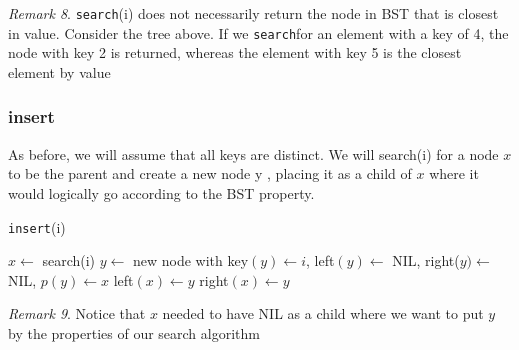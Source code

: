 \documentclass [12pt]{article}
\begin{document}
\textit{Remark 8}. \texttt{search}(i) does not necessarily return the node in BST that is closest in value. Consider the tree above. If we \texttt{search}for an element with a key of 4, the node with key 2 is returned, whereas the element with key 5 is the closest element by value

\subsubsection{insert}
As before, we will assume that all keys are distinct. We will search(i) for a node $x$ to be the parent and create a new node y , placing it as a child of $x$ where it would logically go according to the BST property.

\begin{algorithm}
\caption{\texttt{insert}(i)}\label{alg:bst_inert}
\begin{algorithmic}
\STATE $x \gets $ search(i)
\STATE $y \gets$ new node with key$(y) \gets i$, left$(y) \gets$ NIL, right($y) \gets$ NIL, $p(y) \gets x$
  \STATE left$(x) \gets y$
\ELSE
  \STATE right$(x) \gets y$
\ENDIF
\end{algorithmic}
\end{algorithm}

\textit{Remark 9}. Notice that $x$ needed to have NIL as a child where we want to put $y$ by the properties of our search algorithm
\end{document}
